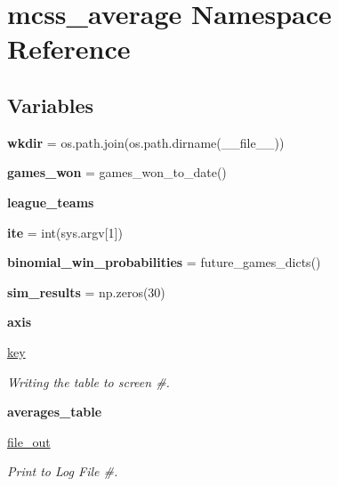 \hypertarget{namespacemcss__average}{}\section{mcss\+\_\+average Namespace Reference}
\label{namespacemcss__average}
\subsection*{Variables}
\begin{DoxyCompactItemize}
\item 
{\bfseries wkdir} = os.\+path.\+join(os.\+path.\+dirname(\+\_\+\+\_\+file\+\_\+\+\_\+))\hypertarget{namespacemcss__average_ae616d8308502bb701c7a6be99d38dbfc}{}\label{namespacemcss__average_ae616d8308502bb701c7a6be99d38dbfc}

\item 
{\bfseries games\+\_\+won} = games\+\_\+won\+\_\+to\+\_\+date()\hypertarget{namespacemcss__average_af0407a471b8414f68f5d5b59f1b57b95}{}\label{namespacemcss__average_af0407a471b8414f68f5d5b59f1b57b95}

\item 
{\bfseries league\+\_\+teams}
\item 
{\bfseries ite} = int(sys.\+argv\mbox{[}1\mbox{]})\hypertarget{namespacemcss__average_ac8bf878fa7748c48c2cc9021c33aa5ec}{}\label{namespacemcss__average_ac8bf878fa7748c48c2cc9021c33aa5ec}

\item 
{\bfseries binomial\+\_\+win\+\_\+probabilities} = future\+\_\+games\+\_\+dicts()\hypertarget{namespacemcss__average_a37592c89802506ab77079b66a773474a}{}\label{namespacemcss__average_a37592c89802506ab77079b66a773474a}

\item 
{\bfseries sim\+\_\+results} = np.\+zeros(30)\hypertarget{namespacemcss__average_a352c20dbeaed4f09a117aa8d5f6a0117}{}\label{namespacemcss__average_a352c20dbeaed4f09a117aa8d5f6a0117}

\item 
{\bfseries axis}\hypertarget{namespacemcss__average_acd5c8d2b0bdff94cce3ca98fae5d9775}{}\label{namespacemcss__average_acd5c8d2b0bdff94cce3ca98fae5d9775}

\item 
\hyperlink{namespacemcss__average_ad3db1f8d740256bab2c357f5d8510c27}{key}\hypertarget{namespacemcss__average_ad3db1f8d740256bab2c357f5d8510c27}{}\label{namespacemcss__average_ad3db1f8d740256bab2c357f5d8510c27}

\begin{DoxyCompactList}\small\item\em Writing the table to screen \#. \end{DoxyCompactList}\item 
{\bfseries averages\+\_\+table}
\item 
\hyperlink{namespacemcss__average_af970b09eef3f66efa462ad2bf266a9a0}{file\+\_\+out}
\begin{DoxyCompactList}\small\item\em Print to Log File \#. \end{DoxyCompactList}\end{DoxyCompactItemize}


